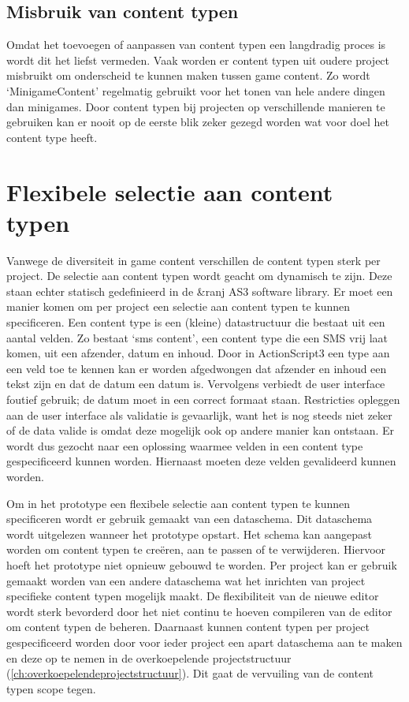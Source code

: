 \subsection{Misbruik van content typen}
Omdat het toevoegen of aanpassen van content typen een langdradig proces is wordt dit het liefst vermeden. Vaak worden er content typen uit oudere project misbruikt om onderscheid te kunnen maken tussen game content. Zo wordt ‘MinigameContent’ regelmatig gebruikt voor het tonen van hele andere dingen dan minigames.
Door content typen bij projecten op verschillende manieren te gebruiken kan er nooit op de eerste blik zeker gezegd worden wat voor doel het content type heeft.

\section{Flexibele selectie aan content typen}
Vanwege de diversiteit in game content verschillen de content typen sterk per project. De selectie aan content typen wordt geacht om dynamisch te zijn. Deze staan echter statisch gedefinieerd in de \&ranj AS3 software library. Er moet een manier komen om per project een selectie aan content typen te kunnen specificeren.
Een content type is een (kleine) datastructuur die bestaat uit een aantal velden. Zo bestaat ‘sms content’, een content type die een SMS vrij laat komen, uit een afzender, datum en inhoud. Door in ActionScript3 een type aan een veld toe te kennen kan er worden afgedwongen dat afzender en inhoud een tekst zijn en dat de datum een datum is. Vervolgens verbiedt de user interface foutief gebruik; de datum moet in een correct formaat staan. Restricties opleggen aan de user interface als validatie is gevaarlijk, want het is nog steeds niet zeker of de data valide is omdat deze mogelijk ook op andere manier kan ontstaan. Er wordt dus gezocht naar een oplossing waarmee velden in een content type gespecificeerd kunnen worden. Hiernaast moeten deze velden gevalideerd kunnen worden.

Om in het prototype een flexibele selectie aan content typen te kunnen specificeren wordt er gebruik gemaakt van een dataschema. Dit dataschema wordt uitgelezen wanneer het prototype opstart. Het schema kan aangepast worden om content typen te creëren, aan te passen of te verwijderen. Hiervoor hoeft het prototype niet opnieuw gebouwd te worden. Per project kan er gebruik gemaakt worden van een andere dataschema wat het inrichten van project specifieke content typen mogelijk maakt. De flexibiliteit van de nieuwe editor wordt sterk bevorderd door het niet continu te hoeven compileren van de editor om content typen de beheren. Daarnaast kunnen content typen per project gespecificeerd worden door voor ieder project een apart dataschema aan te maken en deze op te nemen in de overkoepelende projectstructuur (\autoref{ch:overkoepelendeprojectstructuur}). Dit gaat de vervuiling van de content typen scope tegen.

